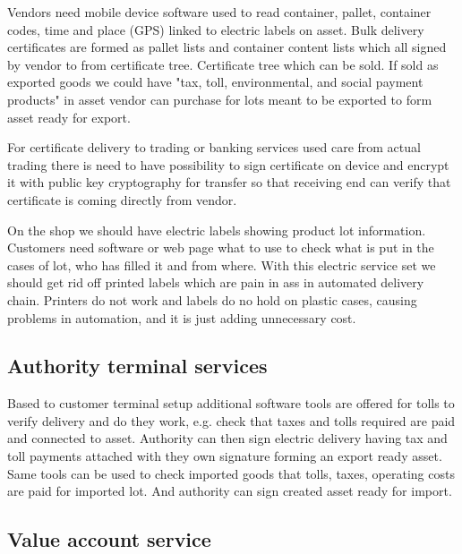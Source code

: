 Vendors need mobile device software used to read container, pallet, container
codes, time and place (GPS) linked to electric labels on asset. Bulk delivery
certificates are formed as pallet lists and container content lists which all
signed by vendor to from certificate tree. Certificate tree which can be sold.
If sold as exported goods we could have "tax, toll, environmental, and social
payment products" in asset vendor can purchase for lots meant to be exported
to form asset ready for export.

For certificate delivery to trading or banking services used care from actual
trading there is need to have possibility to sign certificate on device and
encrypt it with public key cryptography for transfer so that receiving end can
verify that certificate is coming directly from vendor.

On the shop we should have electric labels showing product lot information.
Customers need software or web page what to use to check what is put in the
cases of lot, who has filled it and from where. With this electric service set
we should get rid off printed labels which are pain in ass in automated
delivery chain. Printers do not work and labels do no hold on plastic cases,
causing problems in automation, and it is just adding unnecessary cost.

\subsection{Authority terminal services}
\label{authority_terminal_service}

Based to customer terminal setup additional software tools are offered for
tolls to verify delivery and do they work, e.g. check that taxes and tolls
required are paid and connected to asset. Authority can then sign electric
delivery having tax and toll payments attached with they own signature
forming an export ready asset. Same tools can be used to check imported
goods that tolls, taxes, operating costs are paid for imported lot. And
authority can sign created asset ready for import.

\subsection{Value account service}
\label{value_account_service}

